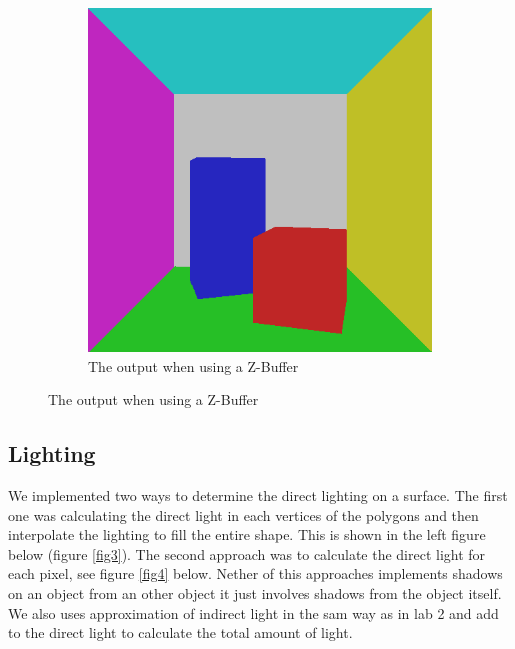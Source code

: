 \documentclass[a4paper,11pt]{article}
\begin{document}
\begin{figure}[h!]
\begin{subfigure}[h!]{0.4\linewidth}
		\includegraphics[width=\linewidth]{screenshot2.png}
		\caption{The output when using a Z-Buffer}
		\label{fig2}
	\end{subfigure}
\end{figure}

\clearpage
\subsection{Lighting}
We implemented two ways to determine the direct lighting on a surface. The first one was calculating the direct light in each vertices of the polygons and then interpolate the lighting to fill the entire shape. This is shown in the left figure below (figure \ref{fig3}). The second approach was to calculate the direct light for each pixel, see figure \ref{fig4} below. Nether of this approaches implements shadows on an object from an other object it just involves shadows from the object itself. We also uses approximation of indirect light in the sam way as in lab 2 and add to the direct light to calculate the total amount of light.
\end{document}
